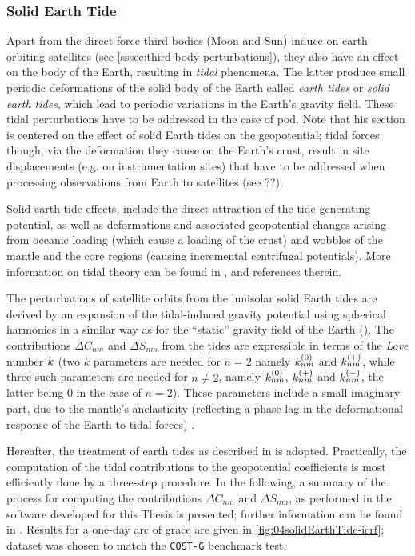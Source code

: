 \subsubsection{Solid Earth Tide}\label{sssec:earth-tide-perturbations}

Apart from the direct force third bodies (Moon and Sun) induce on earth orbiting 
satellites (see \autoref{sssec:third-body-perturbations}), they also have an effect on 
the body of the Earth, resulting in \emph{tidal} phenomena. The latter produce 
small periodic deformations of the solid body of the Earth called \emph{earth tides} 
or \emph{solid earth tides}, which lead to periodic variations in the Earth's gravity 
field. These tidal perturbations have to be addressed in the case of \gls{pod}. 
Note that his section is centered on the effect of solid Earth tides on the geopotential; 
tidal forces though, via the deformation they cause on the Earth's crust, result in 
site displacements (e.g. on instrumentation sites) that have to be addressed when 
processing observations from Earth to satellites (see ??).

Solid earth tide effects, include the direct attraction of the tide generating 
potential, as well as deformations and associated geopotential changes arising 
from oceanic loading (which cause a loading of the crust) and wobbles of the 
mantle and the core regions (causing incremental centrifugal potentials). More 
information on tidal theory can be found in \cite{Wilhelm1997}, \cite{iers2010} 
and references therein. 

The perturbations of satellite orbits from the lunisolar solid Earth tides are
derived by an expansion of the tidal-induced gravity potential using spherical 
harmonics in a similar way as for the ``static'' gravity field of the Earth 
(\cite{Montenbruck2000}). The contributions $\Delta C_{nm}$ and $\Delta S_{nm}$ 
from the tides are expressible in terms of the \emph{Love} number $k$ (two 
$k$ parameters are needed for $n=2$ namely $k ^{(0)}_{nm}$ and $k ^{(+)}_{nm}$, 
while three such parameters are needed for $n \ne 2$, namely $k ^{(0)}_{nm}$, 
$k ^{(+)}_{nm}$ and $k ^{(-)}_{nm}$, the latter being $0$ in the case 
of $n=2$). These parameters include a small imaginary part, due to the mantle's 
anelasticity (reflecting a phase lag in the deformational response of the Earth 
to tidal forces) \cite{iers2010}.

Hereafter, the treatment of earth tides as described in \cite{iers2010} is
adopted. Practically, the computation of the tidal contributions to the 
geopotential coefficients is most efficiently done by a three-step procedure. 
In the following, a summary of the process for computing the contributions 
$\Delta C_{nm}$ and $\Delta S_{nm}$, as performed in the software developed for 
this Thesis is presented; further information can be found in \cite{iers2010}. 
Results for a one-day arc of \gls{grace} are given in \autoref{fig:04solidEarthTide-icrf}; 
dataset was chosen to match the \texttt{COST-G} benchmark test.
 
